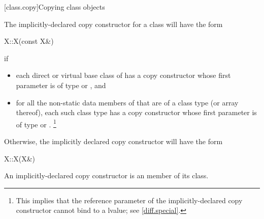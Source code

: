 \documentclass[american]{book}
\begin{document}
\begin{paras}
\setcounter{section}{7}
[class.copy]{Copying class objects}

\setcounter{Paras}{4}
\pnum
The implicitly-declared copy constructor for a class
will have the form

\begin{codeblock}
X::X(const X&)
\end{codeblock}

if

\begin{itemize}
\item
each direct or virtual base class
of
has a copy constructor whose first parameter is of type
or
,
and
\item
for all the non-static data members of
that are of a class type
(or array thereof),
each such class type has a copy constructor whose first parameter is of type
or
.%
\footnote{
This implies that the reference parameter of the
implicitly-declared copy constructor
cannot bind to a
lvalue; see \ref{diff.special}.
}
\end{itemize}

Otherwise, the implicitly declared copy constructor will have the form

\begin{codeblock}
X::X(X&)
\end{codeblock}

An implicitly-declared copy constructor is an
member of its class.
\begin{itemize}
\end{itemize}
\end{paras}
\end{document}
